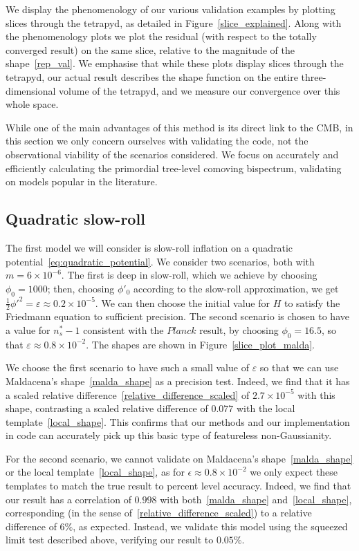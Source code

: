 We display the phenomenology of our various validation examples
by plotting slices through the tetrapyd, as detailed in Figure~\ref{slice_explained}.
Along with the phenomenology plots we plot the residual
(with respect to the totally converged result)
on the same slice, relative to the magnitude of the shape~\eqref{rep_val}.
We emphasise that while these plots display slices through the
tetrapyd, our actual result describes the shape function on the
entire three-dimensional volume of the tetrapyd, and
we measure our convergence over this whole space.

While one of the main advantages of this method is its direct link
to the CMB, in this section we only concern ourselves with validating the
code, not the observational viability of the scenarios considered.
We focus on accurately and efficiently calculating the primordial
tree-level comoving bispectrum, validating on models popular in the
literature.
\subsection{Quadratic slow-roll}
The first model we will consider is slow-roll inflation
on a quadratic potential~\eqref{eq:quadratic_potential}.
We consider two scenarios, both with $m=6\times10^{-6}$.
The first is deep in slow-roll, which we achieve by choosing
$\phi_0=1000$; then, choosing $\phi'_0$ according to the
slow-roll approximation, we get
$\frac{1}{2}\phi'^2=\varepsilon\approx0.2\times10^{-5}$.
We can then choose the initial value for $H$ to
satisfy the Friedmann equation to sufficient precision.
The second scenario is chosen to have a value for $n_s^{*}-1$
consistent with the $\textit{Planck}$ result,
by choosing $\phi_0=16.5$, so that $\varepsilon\approx0.8\times10^{-2}$.
The shapes are shown in Figure~\ref{slice_plot_malda}.


We choose the first scenario to have such a small value of $\varepsilon$
so that we can use Maldacena's shape~\eqref{malda_shape}
as a precision test.
Indeed, we find that it has a scaled relative difference~\eqref{relative_difference_scaled}
of $2.7\times10^{-5}$ with this shape,
contrasting a scaled relative difference
of $0.077$ with the local template~\eqref{local_shape}.
This confirms that our methods and our implementation in code can accurately
pick up this basic type of featureless non-Gaussianity.


For the second scenario, we cannot validate on
Maldacena's shape~\eqref{malda_shape} or the
local template~\eqref{local_shape},
as for $\epsilon\approx0.8\times10^{-2}$ we only expect
these templates to match the true result to percent level accuracy.
Indeed, we find that our result has a correlation of $0.998$
with both~\eqref{malda_shape} and~\eqref{local_shape},
corresponding (in the sense of~\eqref{relative_difference_scaled})
to a relative difference of $6\%$,
as expected.
Instead, we validate this model using
the squeezed limit test described above,
verifying our result to $0.05\%$.


